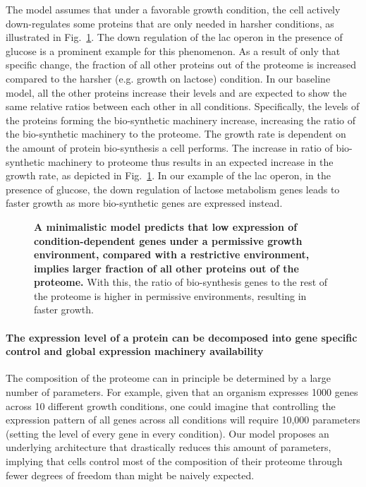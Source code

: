 \documentclass[10pt,letterpaper]{article}
\begin{document}
The model assumes that under a favorable growth condition, the cell actively down-regulates some proteins that are only needed in harsher conditions, as illustrated in Fig.~\ref{fig:model}.
The down regulation of the lac operon in the presence of glucose is a prominent example for this phenomenon.
As a result of only that specific change, the fraction of all other proteins out of the proteome is increased compared to the harsher (e.g. growth on lactose) condition.
In our baseline model, all the other proteins increase their levels and are expected to show the same relative ratios between each other in all conditions.
Specifically, the levels of the proteins forming the bio-synthetic machinery increase, increasing the ratio of the bio-synthetic machinery to the proteome.
The growth rate is dependent on the amount of protein bio-synthesis a cell performs.
The increase in ratio of bio-synthetic machinery to proteome thus results in an expected increase in the growth rate, as depicted in Fig.~\ref{fig:model}.
In our example of the lac operon, in the presence of glucose, the down regulation of lactose metabolism genes leads to faster growth as more bio-synthetic genes are expressed instead.

\begin{figure}[h]
\begin{center}
\caption{\label{fig:model}
{\bf A minimalistic model predicts that low expression of condition-dependent genes under a permissive growth environment, compared with a restrictive environment, implies larger fraction of all other proteins out of the proteome.}
With this, the ratio of bio-synthesis genes to the rest of the proteome is higher in permissive environments, resulting in faster growth.
%
}
\end{center}
\end{figure}

\paragraph{The expression level of a protein can be decomposed into gene specific control and global expression machinery availability}

The composition of the proteome can in principle be determined by a large number of parameters.
For example, given that an organism expresses 1000 genes across 10 different growth conditions, one could imagine that controlling the expression pattern of all genes across all conditions will require 10,000 parameters (setting the level of every gene in every condition).
Our model proposes an underlying architecture that drastically reduces this amount of parameters, implying that cells control most of the composition of their proteome through fewer degrees of freedom than might be naively expected.
\end{document}
